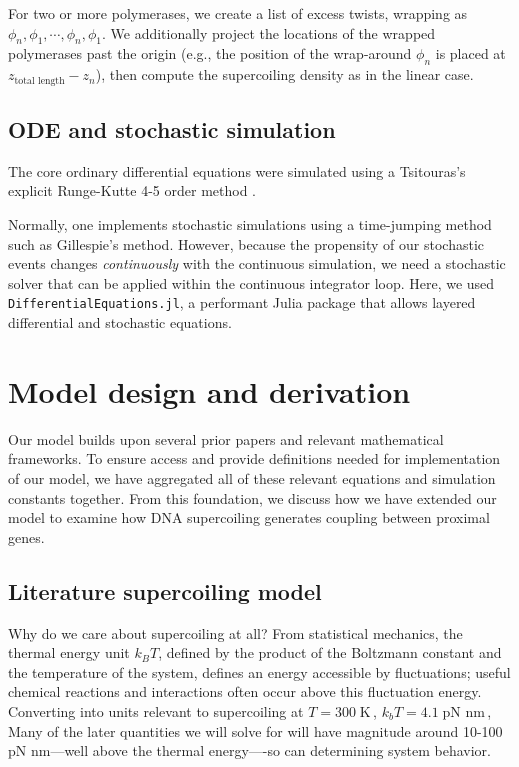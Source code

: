 \documentclass[11pt]{article}
\newcommand{\unit}[1]{\; \text{#1}\,}
\begin{document}
For two or more polymerases, we create a list of excess twists, wrapping as \(\phi_{n}, \phi_1, \cdots, \phi_n, \phi_1\). We additionally project the locations of the wrapped polymerases past the origin (e.g., the position of the wrap-around \(\phi_n\) is placed at \(z_\text{total length} - z_n\)), then compute the supercoiling density as in the linear case.

\subsection{ODE and stochastic simulation}
The core ordinary differential equations were simulated using a Tsitouras's explicit Runge-Kutte 4-5 order method \parencite{tsitourasRungeKuttaPairs2011}.

Normally, one implements stochastic simulations using a time-jumping method such as Gillespie's method. However, because the propensity of our stochastic events changes \emph{continuously} with the continuous simulation, we need a stochastic solver that can be applied within the continuous integrator loop. Here, we used \texttt{DifferentialEquations.jl}, a performant Julia package that allows layered differential and stochastic equations.
\parencite{rackauckasDifferentialEquationsJlPerformant2017}



\section{Model design and derivation}
\label{sec:appendix:model}
Our model builds upon several prior papers and relevant mathematical frameworks. To ensure access and provide definitions needed for implementation of our model, we have aggregated all of these relevant equations and simulation constants together. From this foundation, we discuss how we have extended our model to examine how DNA supercoiling generates coupling between proximal genes. 

\subsection{Literature supercoiling model}
Why do we care about supercoiling at all? From statistical mechanics, the thermal energy unit \(k_B T\), defined by the product of the Boltzmann constant and the temperature of the system, defines an energy accessible by fluctuations; useful chemical reactions and interactions often occur above this fluctuation energy. Converting into units relevant to supercoiling at \(T = 300 \unit{K}\), \(k_b T = 4.1 \unit{pN nm}\),  Many of the later quantities we will solve for will have magnitude around 10-100 pN nm---well above the thermal energy----so can determining system behavior.
\end{document}
